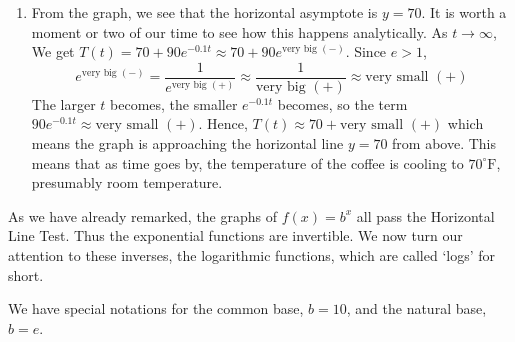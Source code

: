 {\begin{enumerate}
\item  From the graph, we see that the horizontal asymptote is $y = 70$. It is worth a moment or two of our time to see how this happens analytically.  As $t \rightarrow \infty$, We get $T(t) = 70+90e^{-0.1t} \approx 70 +90e^{\text{very big $(-)$}}$.  Since $e > 1$, \[e^{\text{very big $(-)$}} = \frac{1}{e^{\text{very big $(+)$}}} \approx \frac{1}{\text{very big $(+)$}} \approx \text{very small $(+)$}\]  The larger $t$ becomes, the smaller $e^{-0.1t}$ becomes, so the term $90 e^{-0.1t} \approx \text{very small $(+)$}$.  Hence, $T(t) \approx 70 + \text{very small $(+)$}$ which means the graph is approaching the horizontal line $y=70$ from above.  This means that as time goes by, the temperature of the coffee is cooling to $70^{\circ}\mbox{F}$, presumably room temperature. 

\end{enumerate}
}

\medskip

As we have already remarked, the graphs of $f(x) = b^{x}$ all pass the Horizontal Line Test.  Thus the exponential functions are invertible.   We now turn our attention to these inverses, the logarithmic functions, which are called `logs' for short.

\smallskip


\smallskip

We have special notations for the common base, $b=10$, and the natural base, $b=e$.


\smallskip



